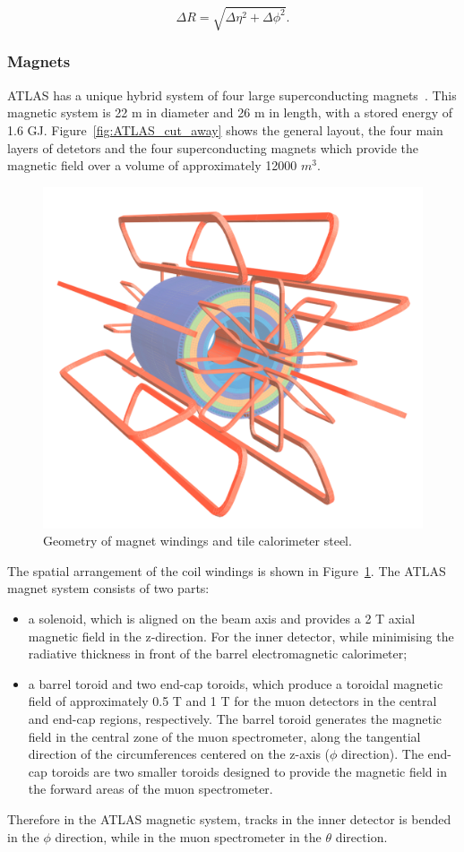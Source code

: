 	\[\Delta R = \sqrt{\Delta \eta^2+\Delta\phi^2}.\]

\subsubsection{Magnets}


	ATLAS has a unique hybrid system of four large superconducting 
	magnets~\cite{ATLAS-TDR-06}. This magnetic system is 22 m in diameter and 26 m in length, 
	with a stored energy of 1.6 GJ.
	Figure~\ref{fig:ATLAS_cut_away} shows the general layout, 
	the four main layers of detetors and the four superconducting 
	magnets which provide the magnetic
	field over a volume of approximately 12000 $m^3$.
	
	\begin{figure}[bht]
		\begin{centering}	
		\includegraphics[width=.36\textwidth]{Detector_plots/ATLAS magnets.png}
		\caption{Geometry of magnet windings and
		tile calorimeter steel.	}
		\label{fig:ATLAS_magnets}
		\end{centering}
	\end{figure}

	The spatial arrangement of the coil windings is shown in 
	Figure~\ref{fig:ATLAS_magnets}. 
	The ATLAS magnet system consists of two parts:
	\begin{itemize}
		\item a solenoid, which is aligned on the beam axis and 
		provides a 2 T axial magnetic field in the z-direction. 
		For the inner detector, while minimising 
		the radiative thickness in front of the	barrel 
		electromagnetic calorimeter;
		\item  a barrel toroid and two end-cap toroids, 
		which produce a	toroidal magnetic field of approximately 
		0.5 T and 1 T for the muon detectors in the central 
		and end-cap regions, respectively. 
		The barrel toroid generates the magnetic field in the central zone 
		of the muon spectrometer, along the tangential direction of 
		the circumferences centered on the z-axis ($\phi$ direction). 
		The end-cap toroids are two smaller toroids designed to 
		provide the magnetic field in the forward areas of 
		the muon spectrometer. 
		
		
	\end{itemize}		
	Therefore in the ATLAS magnetic system, tracks in the inner detector
	is bended in the $\phi$ direction, while in the muon spectrometer 
	in the $\theta$ direction.


